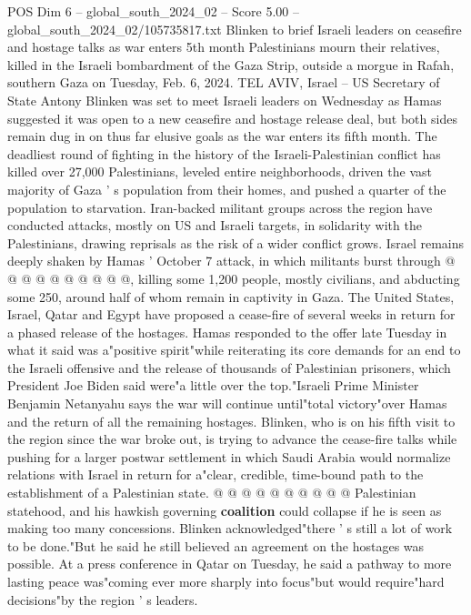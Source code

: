 \begin{textsample}{POS Dim 6 – global\_south\_2024\_02 – Score 5.00 – global\_south\_2024\_02/105735817.txt}  \label{ex:f6_pos_184}
Blinken to brief Israeli leaders on ceasefire and hostage talks as war enters 5th month Palestinians mourn their relatives, killed in the Israeli bombardment of the Gaza Strip, outside a morgue in Rafah, southern Gaza on Tuesday, Feb. 6, 2024.
TEL AVIV, Israel -- US Secretary of State Antony Blinken was set to meet Israeli leaders on Wednesday as Hamas suggested it was open to a new ceasefire and hostage release deal, but both sides remain dug in on thus far elusive goals as the war enters its fifth month.
The deadliest round of fighting in the history of the Israeli-Palestinian conflict has killed over 27,000 Palestinians, leveled entire neighborhoods, driven the vast majority of Gaza ' s population from their homes, and pushed a quarter of the population to starvation.
Iran-backed militant groups across the region have conducted attacks, mostly on US and Israeli targets, in solidarity with the Palestinians, drawing reprisals as the risk of a wider conflict grows.
Israel remains deeply shaken by Hamas ' October 7 attack, in which militants burst through @ @ @ @ @ @ @ @ @ @, killing some 1,200 people, mostly civilians, and abducting some 250, around half of whom remain in captivity in Gaza.
The United States, Israel, Qatar and Egypt have proposed a cease-fire of several weeks in return for a phased release of the hostages.
Hamas responded to the offer late Tuesday in what it said was a"positive spirit"while reiterating its core demands for an end to the Israeli offensive and the release of thousands of Palestinian prisoners, which President Joe Biden said were"a little over the top."Israeli Prime Minister Benjamin Netanyahu says the war will continue until"total victory"over Hamas and the return of all the remaining hostages.
Blinken, who is on his fifth visit to the region since the war broke out, is trying to advance the cease-fire talks while pushing for a larger postwar settlement in which Saudi Arabia would normalize relations with Israel in return for a"clear, credible, time-bound path to the establishment of a Palestinian state. @ @ @ @ @ @ @ @ @ @ Palestinian statehood, and his hawkish governing \textbf{coalition} could collapse if he is seen as making too many concessions.
Blinken acknowledged"there ' s still a lot of work to be done."But he said he still believed an agreement on the hostages was possible.
At a press conference in Qatar on Tuesday, he said a pathway to more lasting peace was"coming ever more sharply into focus"but would require"hard decisions"by the region ' s leaders.

\end{textsample}
